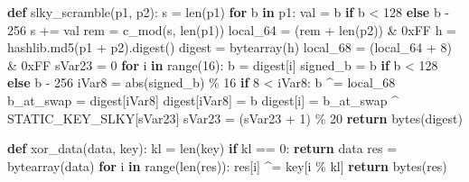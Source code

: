 \documentclass[
]{article}
\newenvironment{Shaded}{}{}
\newcommand{\BaseNTok}[1]{\textcolor[rgb]{0.25,0.63,0.44}{#1}}
\newcommand{\BuiltInTok}[1]{\textcolor[rgb]{0.00,0.50,0.00}{#1}}
\newcommand{\ControlFlowTok}[1]{\textcolor[rgb]{0.00,0.44,0.13}{\textbf{#1}}}
\newcommand{\DecValTok}[1]{\textcolor[rgb]{0.25,0.63,0.44}{#1}}
\newcommand{\KeywordTok}[1]{\textcolor[rgb]{0.00,0.44,0.13}{\textbf{#1}}}
\newcommand{\NormalTok}[1]{#1}
\newcommand{\OperatorTok}[1]{\textcolor[rgb]{0.40,0.40,0.40}{#1}}
\begin{document}
\begin{Shaded}
\begin{Highlighting}[]
\KeywordTok{def}\NormalTok{ slky\_scramble(p1, p2):}
\NormalTok{    s }\OperatorTok{=} \BuiltInTok{len}\NormalTok{(p1)}
    \ControlFlowTok{for}\NormalTok{ b }\KeywordTok{in}\NormalTok{ p1:}
\NormalTok{        val }\OperatorTok{=}\NormalTok{ b }\ControlFlowTok{if}\NormalTok{ b }\OperatorTok{\textless{}} \DecValTok{128} \ControlFlowTok{else}\NormalTok{ b }\OperatorTok{{-}} \DecValTok{256}
\NormalTok{        s }\OperatorTok{+=}\NormalTok{ val}
\NormalTok{    rem }\OperatorTok{=}\NormalTok{ c\_mod(s, }\BuiltInTok{len}\NormalTok{(p1))}
\NormalTok{    local\_64 }\OperatorTok{=}\NormalTok{ (rem }\OperatorTok{+} \BuiltInTok{len}\NormalTok{(p2)) }\OperatorTok{\&} \BaseNTok{0xFF}
\NormalTok{    h }\OperatorTok{=}\NormalTok{ hashlib.md5(p1 }\OperatorTok{+}\NormalTok{ p2).digest()}
\NormalTok{    digest }\OperatorTok{=} \BuiltInTok{bytearray}\NormalTok{(h)}
\NormalTok{    local\_68 }\OperatorTok{=}\NormalTok{ (local\_64 }\OperatorTok{+} \DecValTok{8}\NormalTok{) }\OperatorTok{\&} \BaseNTok{0xFF}
\NormalTok{    sVar23 }\OperatorTok{=} \DecValTok{0}
    \ControlFlowTok{for}\NormalTok{ i }\KeywordTok{in} \BuiltInTok{range}\NormalTok{(}\DecValTok{16}\NormalTok{):}
\NormalTok{        b }\OperatorTok{=}\NormalTok{ digest[i]}
\NormalTok{        signed\_b }\OperatorTok{=}\NormalTok{ b }\ControlFlowTok{if}\NormalTok{ b }\OperatorTok{\textless{}} \DecValTok{128} \ControlFlowTok{else}\NormalTok{ b }\OperatorTok{{-}} \DecValTok{256}
\NormalTok{        iVar8 }\OperatorTok{=} \BuiltInTok{abs}\NormalTok{(signed\_b) }\OperatorTok{\%} \DecValTok{16}
        \ControlFlowTok{if} \DecValTok{8} \OperatorTok{\textless{}}\NormalTok{ iVar8:}
\NormalTok{            b }\OperatorTok{\^{}=}\NormalTok{ local\_68}
\NormalTok{        b\_at\_swap }\OperatorTok{=}\NormalTok{ digest[iVar8]}
\NormalTok{        digest[iVar8] }\OperatorTok{=}\NormalTok{ b}
\NormalTok{        digest[i] }\OperatorTok{=}\NormalTok{ b\_at\_swap }\OperatorTok{\^{}}\NormalTok{ STATIC\_KEY\_SLKY[sVar23]}
\NormalTok{        sVar23 }\OperatorTok{=}\NormalTok{ (sVar23 }\OperatorTok{+} \DecValTok{1}\NormalTok{) }\OperatorTok{\%} \DecValTok{20}
    \ControlFlowTok{return} \BuiltInTok{bytes}\NormalTok{(digest)}

\KeywordTok{def}\NormalTok{ xor\_data(data, key):}
\NormalTok{    kl }\OperatorTok{=} \BuiltInTok{len}\NormalTok{(key)}
    \ControlFlowTok{if}\NormalTok{ kl }\OperatorTok{==} \DecValTok{0}\NormalTok{: }\ControlFlowTok{return}\NormalTok{ data}
\NormalTok{    res }\OperatorTok{=} \BuiltInTok{bytearray}\NormalTok{(data)}
    \ControlFlowTok{for}\NormalTok{ i }\KeywordTok{in} \BuiltInTok{range}\NormalTok{(}\BuiltInTok{len}\NormalTok{(res)):}
\NormalTok{        res[i] }\OperatorTok{\^{}=}\NormalTok{ key[i }\OperatorTok{\%}\NormalTok{ kl]}
    \ControlFlowTok{return} \BuiltInTok{bytes}\NormalTok{(res)}


\end{Highlighting}
\end{Shaded}
\end{document}
